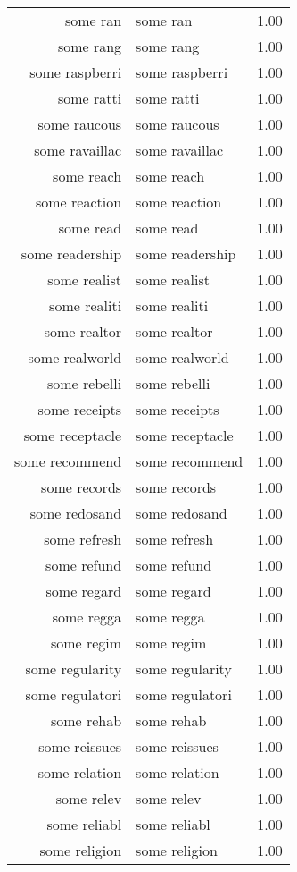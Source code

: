 \begin{table}[ht]
\begin{tabular}{rlr}
  some ran & some ran & 1.00 \\ 
  some rang & some rang & 1.00 \\ 
  some raspberri & some raspberri & 1.00 \\ 
  some ratti & some ratti & 1.00 \\ 
  some raucous & some raucous & 1.00 \\ 
  some ravaillac & some ravaillac & 1.00 \\ 
  some reach & some reach & 1.00 \\ 
  some reaction & some reaction & 1.00 \\ 
  some read & some read & 1.00 \\ 
  some readership & some readership & 1.00 \\ 
  some realist & some realist & 1.00 \\ 
  some realiti & some realiti & 1.00 \\ 
  some realtor & some realtor & 1.00 \\ 
  some realworld & some realworld & 1.00 \\ 
  some rebelli & some rebelli & 1.00 \\ 
  some receipts & some receipts & 1.00 \\ 
  some receptacle & some receptacle & 1.00 \\ 
  some recommend & some recommend & 1.00 \\ 
  some records & some records & 1.00 \\ 
  some redosand & some redosand & 1.00 \\ 
  some refresh & some refresh & 1.00 \\ 
  some refund & some refund & 1.00 \\ 
  some regard & some regard & 1.00 \\ 
  some regga & some regga & 1.00 \\ 
  some regim & some regim & 1.00 \\ 
  some regularity & some regularity & 1.00 \\ 
  some regulatori & some regulatori & 1.00 \\ 
  some rehab & some rehab & 1.00 \\ 
  some reissues & some reissues & 1.00 \\ 
  some relation & some relation & 1.00 \\ 
  some relev & some relev & 1.00 \\ 
  some reliabl & some reliabl & 1.00 \\ 
  some religion & some religion & 1.00 \\ 

\end{tabular}
\end{table}
